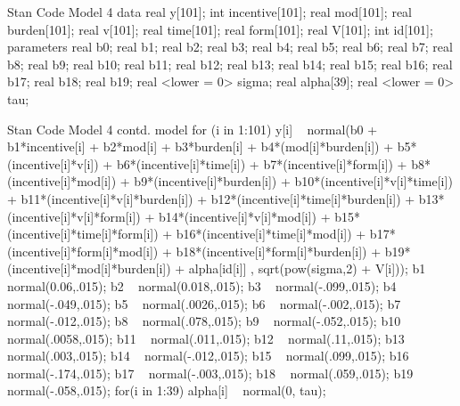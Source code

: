 \documentclass{article}
\begin{document}
\begin{sexylisting}{Stan Code Model 4}
data{
  real y[101];
  int incentive[101];
  real mod[101];
  real burden[101];
  real v[101];
  real time[101];
  real form[101];
  real V[101];
  int id[101];
}
parameters{
  real b0;
  real b1;
  real b2;
  real b3;
  real b4;
  real b5;
  real b6;
  real b7;
  real b8;
  real b9;
  real b10;
  real b11;
  real b12;
  real b13;
  real b14;
  real b15;
  real b16;
  real b17;
  real b18;
  real b19;
  real <lower = 0> sigma;
  real alpha[39];
  real <lower = 0> tau;
}
\end{sexylisting}
\begin{sexylisting}{Stan Code Model 4 contd.}
model{
for (i in 1:101){
    y[i] ~ normal(b0 + b1*incentive[i] + b2*mod[i]
                  + b3*burden[i] + b4*(mod[i]*burden[i])  
                  + b5*(incentive[i]*v[i])
                  + b6*(incentive[i]*time[i])
                  + b7*(incentive[i]*form[i])
                  + b8*(incentive[i]*mod[i])
                  + b9*(incentive[i]*burden[i])
                  + b10*(incentive[i]*v[i]*time[i])
                  + b11*(incentive[i]*v[i]*burden[i])
                  + b12*(incentive[i]*time[i]*burden[i])
                  + b13*(incentive[i]*v[i]*form[i])
                  + b14*(incentive[i]*v[i]*mod[i])
                  + b15*(incentive[i]*time[i]*form[i])
                  + b16*(incentive[i]*time[i]*mod[i])
                  + b17*(incentive[i]*form[i]*mod[i])
                  + b18*(incentive[i]*form[i]*burden[i])
                  + b19*(incentive[i]*mod[i]*burden[i])
                  + alpha[id[i]] , sqrt(pow(sigma,2) + V[i]));
b1 ~ normal(0.06,.015);
b2 ~ normal(0.018,.015);
b3 ~ normal(-.099,.015);
b4 ~ normal(-.049,.015);
b5 ~ normal(.0026,.015);
b6 ~ normal(-.002,.015);
b7 ~ normal(-.012,.015);
b8 ~ normal(.078,.015);
b9 ~ normal(-.052,.015);
b10 ~ normal(.0058,.015);
b11 ~ normal(.011,.015);
b12 ~ normal(.11,.015);
b13 ~ normal(.003,.015);
b14 ~ normal(-.012,.015);
b15 ~ normal(.099,.015);
b16 ~ normal(-.174,.015);
b17 ~ normal(-.003,.015);
b18 ~ normal(.059,.015);
b19 ~ normal(-.058,.015);
}
for(i in 1:39){
    alpha[i] ~ normal(0, tau);}
}
\end{sexylisting}
\end{document}
